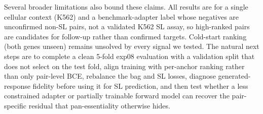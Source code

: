 Several broader limitations also bound these claims. All results are for a single
cellular context (K562) and a benchmark-adapter label whose negatives are
unconfirmed non-SL pairs, not a validated K562 SL assay, so high-ranked pairs are
candidates for follow-up rather than confirmed targets. Cold-start ranking (both
genes unseen) remains unsolved by every signal we tested. The natural next steps
are to complete a clean 5-fold exp08 evaluation with a validation split that does
not select on the test fold, align training with per-anchor ranking rather than
only pair-level BCE, rebalance the bag and SL losses, diagnose generated-response
fidelity before using it for SL prediction, and then test whether a less
constrained adapter or partially trainable forward model can recover the
pair-specific residual that pan-essentiality otherwise hides.
